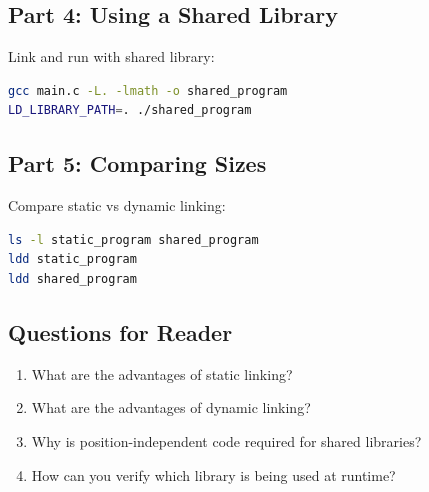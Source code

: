\subsection{Part 4: Using a Shared Library}

Link and run with shared library:

\begin{lstlisting}[language=bash]
gcc main.c -L. -lmath -o shared_program
LD_LIBRARY_PATH=. ./shared_program
\end{lstlisting}

\subsection{Part 5: Comparing Sizes}

Compare static vs dynamic linking:

\begin{lstlisting}[language=bash]
ls -l static_program shared_program
ldd static_program
ldd shared_program
\end{lstlisting}

\subsection{Questions for Reader}

\begin{enumerate}
\item What are the advantages of static linking?
\item What are the advantages of dynamic linking?
\item Why is position-independent code required for shared libraries?
\item How can you verify which library is being used at runtime?
\end{enumerate}
